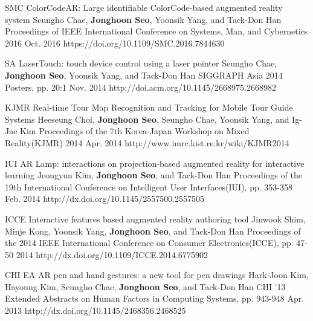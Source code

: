 \begin{cventries}
  \cvpublicationentry
    {SMC} %
    {ColorCodeAR: Large identifiable ColorCode-based augmented reality system} %
    {Seungho Chae, \textbf{Jonghoon Seo}, Yoonsik Yang, and Tack-Don Han} %
    {Proceedings of IEEE International Conference on Systems, Man, and Cybernetics 2016}
    {Oct. 2016} %
    {https://doi.org/10.1109/SMC.2016.7844630}

  \cvpublicationentry
    {SA} %
    {LaserTouch: touch device control using a laser pointer} %
    {Seungho Chae, \textbf{Jonghoon Seo}, Yoonsik Yang, and Tack-Don Han} %
    {SIGGRAPH Asia 2014 Posters, pp. 20:1}
    {Nov. 2014} %
    {http://doi.acm.org/10.1145/2668975.2668982}

  \cvpublicationentry
    {KJMR} %
    {Real-time Tour Map Recognition and Tracking for Mobile Tour Guide Systems} %
    {Heeseung Choi, \textbf{Jonghoon Seo}, Seungho Chae, Yoonsik Yang, and Ig-Jae Kim} %
    {Proceedings of the 7th Korea-Japan Workshop on Mixed Reality(KJMR) 2014}
    {Apr. 2014} %
    {http://www.imrc.kist.re.kr/wiki/KJMR2014}

  \cvpublicationentry
    {IUI} %
    {AR Lamp: interactions on projection-based augmented reality for interactive learning} %
    {Jeongyun Kim, \textbf{Jonghoon Seo}, and Tack-Don Han} %
    {Proceedings of the 19th International Conference on Intelligent User Interfaces(IUI), pp. 353-358}
    {Feb. 2014} %
    {http://dx.doi.org/10.1145/2557500.2557505}

  \cvpublicationentry
    {ICCE} %
    {Interactive features based augmented reality authoring tool} %
    {Jinwook Shim, Minje Kong, Yoonsik Yang, \textbf{Jonghoon Seo}, and Tack-Don Han} %
    {Proceedings of the 2014 IEEE International Conference on Consumer Electronics(ICCE), pp. 47-50}
    {2014} %
    {http://dx.doi.org/10.1109/ICCE.2014.6775902}

  \cvpublicationentry
    {CHI EA} %
    {AR pen and hand gestures: a new tool for pen drawings} %
    {Hark-Joon Kim, Hayoung Kim, Seungho Chae, \textbf{Jonghoon Seo}, and Tack-Don Han} %
    {CHI '13 Extended Abstracts on Human Factors in Computing Systems, pp. 943-948}
    {Apr. 2013} %
    {http://dx.doi.org/10.1145/2468356.2468525}


\end{cventries}
